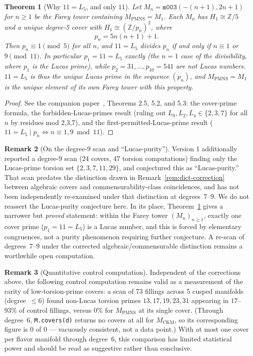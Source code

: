 \documentclass[12pt]{article}
\newtheorem{theorem}{Theorem}
\theoremstyle{definition}
\newtheorem{remark}[theorem]{Remark}
\newcommand{\Z}{\mathbb{Z}}
\begin{document}
\begin{theorem}[Why $11=L_5$, and only $11$]
\label{thm:why11}
Let $M_n=\texttt{m003}(-(n+1),2n+1)$ for $n\geq1$ be the Farey tower
containing $M_{\mathrm{PMNS}}=M_1$. Each $M_n$ has $H_1\cong\Z/5$ and
a unique degree-5 cover with $H_1\cong(\Z/p_n)^2$, where
\[
  p_n = 5n(n+1)+1.
\]
Then $p_n\equiv1\pmod5$ for all $n$, and $11=L_5$ divides $p_n$ if and
only if $n\equiv1$ or $9\pmod{11}$. In particular $p_1=11=L_5$
exactly (the $n=1$ case of the divisibility, where $p_1$ \emph{is}
the Lucas prime), while $p_2=31,\ldots,p_{10}=541$ are not Lucas
numbers. $11=L_5$ is thus the \emph{unique} Lucas prime in the
sequence $(p_n)$, and $M_{\mathrm{PMNS}}=M_1$ is the unique element
of its own Farey tower with this property.
\end{theorem}

\begin{proof}
See the companion paper~\cite{gentry-z5bridge}, Theorems 2.5, 5.2,
and 5.3: the cover-prime formula, the forbidden-Lucas-primes result
(ruling out $L_0,L_2,L_4\in\{2,3,7\}$ for all $n$ by residues mod
2,3,7), and the first-permitted-Lucas-prime result
($11=L_5\mid p_n\iff n\equiv1,9\bmod11$).
\end{proof}

\begin{remark}[On the degree-9 scan and ``Lucas-purity'']
\label{rem:purity-status}
Version 1 additionally reported a degree-9 scan (24 covers, 47
torsion computations) finding only the Lucas-prime torsion set
$\{2,3,7,11,29\}$, and conjectured this as ``Lucas-purity.'' That
scan predates the distinction drawn in
Remark~\ref{rem:dict-correction} between algebraic covers and
commensurability-class coincidences, and has not been independently
re-examined under that distinction at degrees~7--9. We do not
reassert the Lucas-purity conjecture here. In its place,
Theorem~\ref{thm:why11} gives a narrower but \emph{proved} statement:
within the Farey tower $(M_n)_{n\geq1}$, exactly one cover prime
($p_1=11=L_5$) is a Lucas number, and this is forced by elementary
congruences, not a purity phenomenon requiring further conjecture.
A re-scan of degrees~7--9 under the corrected algebraic/commensurable
distinction remains a worthwhile open computation.
\end{remark}

\begin{remark}[Quantitative control computation]
\label{rem:controls}
Independent of the corrections above, the following control
computation remains valid as a measurement of the rarity of
low-torsion-prime covers: a scan of 73 fillings across 5 cusped
manifolds (degree~$\leq6$) found non-Lucas torsion primes
$13,17,19,23,31$ appearing in $17$--$93\%$ of control fillings,
versus $0\%$ for $M_{\mathrm{PMNS}}$ at its single cover. (Through
degree~6, \texttt{M.covers(d)} returns no covers at all for
$M_{\mathrm{CKM}}$, so its corresponding figure is $0$ of $0$ ---
vacuously consistent, not a data point.) With at most one cover per
flavor manifold through degree~6, this comparison has limited
statistical power and should be read as suggestive rather than
conclusive.
\end{remark}
\end{document}
